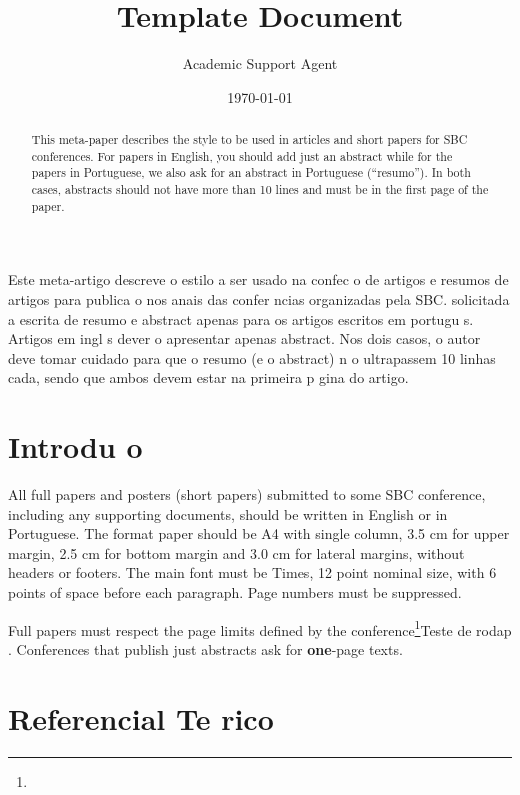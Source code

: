 \documentclass{article}
\title{Template Document}
\author{Academic Support Agent}
\date{\today}
\begin{document}
\maketitle

\maketitle

\begin{abstract}
  This meta-paper describes the style to be used in articles and short papers
  for SBC conferences. For papers in English, you should add just an abstract
  while for the papers in Portuguese, we also ask for an abstract in
  Portuguese (``resumo''). In both cases, abstracts should not have more than
  10 lines and must be in the first page of the paper.
\end{abstract}
     
\begin{resumo} 
  Este meta-artigo descreve o estilo a ser usado na confec o de artigos e
  resumos de artigos para publica o nos anais das confer ncias organizadas
  pela SBC.   solicitada a escrita de resumo e abstract apenas para os artigos
  escritos em portugu s. Artigos em ingl s dever o apresentar apenas abstract.
  Nos dois casos, o autor deve tomar cuidado para que o resumo (e o abstract)
  n o ultrapassem 10 linhas cada, sendo que ambos devem estar na primeira
  p gina do artigo.
\end{resumo}


\section{Introdu o}

All full papers and posters (short papers) submitted to some SBC conference,
including any supporting documents, should be written in English or in
Portuguese. The format paper should be A4 with single column, 3.5 cm for upper
margin, 2.5 cm for bottom margin and 3.0 cm for lateral margins, without
headers or footers. The main font must be Times, 12 point nominal size, with 6
points of space before each paragraph. Page numbers must be suppressed.

Full papers must respect the page limits defined by the conference\footnote{}{Teste de rodap }.
Conferences that publish just abstracts ask for \textbf{one}-page texts.

\section{Referencial Te rico} \label{sec:firstpage}
\end{document}
